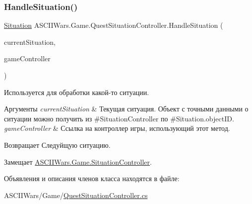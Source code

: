 \subsubsection{\texorpdfstring{Handle\+Situation()}{HandleSituation()}}
{\footnotesize\ttfamily \hyperlink{class_a_s_c_i_i_wars_1_1_game_1_1_situation}{Situation} A\+S\+C\+I\+I\+Wars.\+Game.\+Quest\+Situation\+Controller.\+Handle\+Situation (\begin{DoxyParamCaption}\item[{\hyperlink{class_a_s_c_i_i_wars_1_1_game_1_1_situation}{Situation}}]{current\+Situation,  }\item[{\hyperlink{class_a_s_c_i_i_wars_1_1_game_1_1_game_controller}{Game\+Controller}}]{game\+Controller }\end{DoxyParamCaption})\hspace{0.3cm}{\ttfamily [inline]}}



Используется для обработки какой-\/то ситуации. 


\begin{DoxyParams}{Аргументы}
{\em current\+Situation} & Текущая ситуация. Объект с точными данными о ситуации можно получить из \#\+Situation\+Controller по \#\+Situation.\+object\+ID. \\
\hline
{\em game\+Controller} & Ссылка на контроллер игры, использующий этот метод. \\
\hline
\end{DoxyParams}
\begin{DoxyReturn}{Возвращает}
Следуйщую ситуацию. 
\end{DoxyReturn}


Замещает \hyperlink{interface_a_s_c_i_i_wars_1_1_game_1_1_situation_controller_a2cf0359dfc1683beb63f0dfed1c372e6}{A\+S\+C\+I\+I\+Wars.\+Game.\+Situation\+Controller}.



Объявления и описания членов класса находятся в файле\+:\begin{DoxyCompactItemize}
\item 
A\+S\+C\+I\+I\+Wars/\+Game/\hyperlink{_quest_situation_controller_8cs}{Quest\+Situation\+Controller.\+cs}\end{DoxyCompactItemize}
